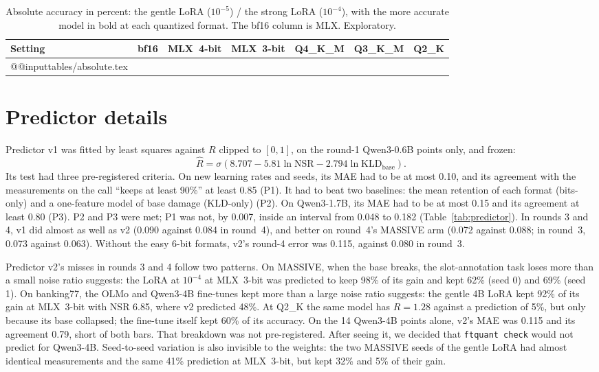 \documentclass[10pt]{article}
\makeatletter
\newcommand*{\tablerows}[1]{\csname @@input\endcsname #1 }
\makeatother
\begin{document}
\begin{table}[htbp]
\centering\footnotesize
\caption{Absolute accuracy in percent: the gentle LoRA ($10^{-5}$) / the strong LoRA ($10^{-4}$), with the more accurate model in bold at each quantized format. The bf16 column is MLX. Exploratory.}
\label{tab:absolute}
\setlength{\tabcolsep}{4pt}
\begin{tabular}{lcccccc}
\toprule
Setting & bf16 & MLX~4-bit & MLX~3-bit & Q4\_K\_M & Q3\_K\_M & Q2\_K \\
\midrule
\tablerows{tables/absolute.tex}
\bottomrule
\end{tabular}
\end{table}

\clearpage
\section{Predictor details}
\label{app:predictor}

Predictor v1 was fitted by least squares against $R$ clipped to $[0,1]$, on the round-1 Qwen3-0.6B points only, and frozen:
\begin{equation}
\hat R = \sigma\left(8.707 - 5.81 \ln \mathrm{NSR} - 2.794 \ln \mathrm{KLD}_{\mathrm{base}}\right).
\end{equation}
Its test had three pre-registered criteria. On new learning rates and seeds, its MAE had to be at most 0.10, and its agreement with the measurements on the call ``keeps at least 90\%'' at least 0.85 (P1). It had to beat two baselines: the mean retention of each format (bits-only) and a one-feature model of base damage (KLD-only) (P2). On Qwen3-1.7B, its MAE had to be at most 0.15 and its agreement at least 0.80 (P3). P2 and P3 were met; P1 was not, by 0.007, inside an interval from 0.048 to 0.182 (Table~\ref{tab:predictor}). In rounds 3 and 4, v1 did almost as well as v2 (0.090 against 0.084 in round~4), and better on round~4's MASSIVE arm (0.072 against 0.088; in round~3, 0.073 against 0.063). Without the easy 6-bit formats, v2's round-4 error was 0.115, against 0.080 in round~3.

Predictor v2's misses in rounds 3 and 4 follow two patterns. On MASSIVE, when the base breaks, the slot-annotation task loses more than a small noise ratio suggests: the LoRA at $10^{-4}$ at MLX~3-bit was predicted to keep 98\% of its gain and kept 62\% (seed 0) and 69\% (seed 1). On banking77, the OLMo and Qwen3-4B fine-tunes kept more than a large noise ratio suggests: the gentle 4B LoRA kept 92\% of its gain at MLX~3-bit with NSR 6.85, where v2 predicted 48\%. At Q2\_K the same model has $R = 1.28$ against a prediction of 5\%, but only because its base collapsed; the fine-tune itself kept 60\% of its accuracy. On the 14 Qwen3-4B points alone, v2's MAE was 0.115 and its agreement 0.79, short of both bars. That breakdown was not pre-registered. After seeing it, we decided that \texttt{ftquant check} would not predict for Qwen3-4B. Seed-to-seed variation is also invisible to the weights: the two MASSIVE seeds of the gentle LoRA had almost identical measurements and the same 41\% prediction at MLX~3-bit, but kept 32\% and 5\% of their gain.
\end{document}
